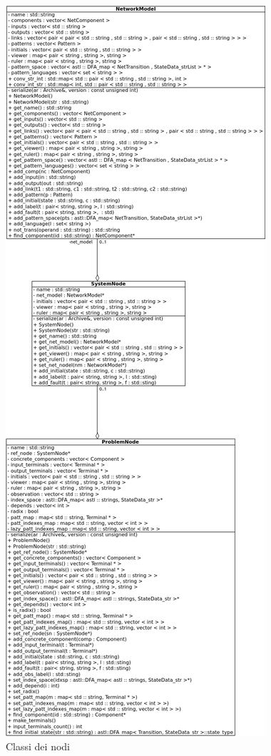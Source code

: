 \begin{figure}[htbp]
\centering
\includegraphics[scale=0.5]{./Img/implementazione/nodes.png}
\caption{Classi dei nodi}
\label{fig:nodes}
\end{figure}

